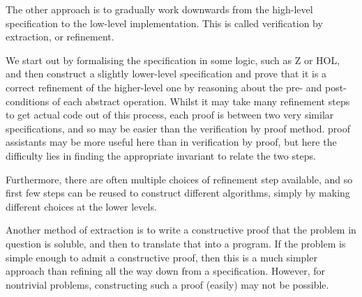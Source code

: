 The other approach is to gradually work downwards from the high-level
specification to the low-level implementation. This is called
\gls{verification by extraction}, or refinement.

We start out by formalising the specification in some logic, such as Z
or HOL, and then construct a slightly lower-level specification and
prove that it is a correct refinement of the higher-level one by
reasoning about the pre- and post-conditions of each abstract
operation. Whilst it may take many refinement steps to get actual code
out of this process, each proof is between two very similar
\glspl{specification}, and so may be easier than the verification by
proof method. \Glspl{proof assistant} may be more useful here than in
verification by proof, but here the difficulty lies in finding the
appropriate invariant to relate the two steps.

Furthermore, there are often multiple choices of refinement step
available, and so first few steps can be reused to construct different
algorithms, simply by making different choices at the lower levels.

Another method of extraction is to write a constructive proof that the
problem in question is soluble, and then to translate that into a
program. If the problem is simple enough to admit a constructive
proof, then this is a much simpler approach than refining all the way
down from a specification. However, for nontrivial problems,
constructing such a proof (easily) may not be possible.

